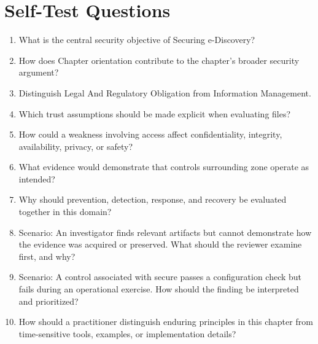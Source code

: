 \documentclass[11pt]{article}
\begin{document}
\section*{Self-Test Questions}
\begin{enumerate}
\item What is the central security objective of Securing e-Discovery?
\item How does Chapter orientation contribute to the chapter's broader security argument?
\item Distinguish Legal And Regulatory Obligation from Information Management.
\item Which trust assumptions should be made explicit when evaluating files?
\item How could a weakness involving access affect confidentiality, integrity, availability, privacy, or safety?
\item What evidence would demonstrate that controls surrounding zone operate as intended?
\item Why should prevention, detection, response, and recovery be evaluated together in this domain?
\item Scenario: An investigator finds relevant artifacts but cannot demonstrate how the evidence was acquired or preserved. What should the reviewer examine first, and why?
\item Scenario: A control associated with secure passes a configuration check but fails during an operational exercise. How should the finding be interpreted and prioritized?
\item How should a practitioner distinguish enduring principles in this chapter from time-sensitive tools, examples, or implementation details?
\end{enumerate}
\end{document}
